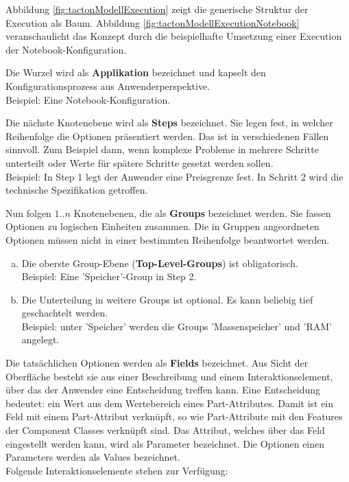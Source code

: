 \documentclass[12pt,a4paper,bibliography=totocnumbered,listof=totoc]{scrartcl}
\begin{document}
Abbildung \ref{fig:tactonModellExecution} zeigt die generische Struktur der Execution als Baum. Abbildung \ref{fig:tactonModellExecutionNotebook} veranschaulicht das Konzept durch die beispielhafte Umsetzung einer Execution der Notebook-Konfiguration.
\begin{compactitem}
\item Die Wurzel wird als \textbf{Applikation} bezeichnet und kapselt den Konfigurationsprozess aus Anwenderperspektive.\\
Beispiel: Eine Notebook-Konfiguration.
\item Die nächste Knotenebene wird als \textbf{Steps} bezeichnet. Sie legen fest, in welcher Reihenfolge die Optionen präsentiert werden. Das ist in verschiedenen Fällen sinnvoll. Zum Beispiel dann, wenn komplexe Probleme in mehrere Schritte unterteilt oder Werte für spätere Schritte gesetzt werden sollen.\\
Beispiel: In Step 1 legt der Anwender eine Preisgrenze fest. In Schritt 2 wird die technische Spezifikation getroffen.
\item  Nun folgen $1..n$ Knotenebenen, die als \textbf{Groups} bezeichnet werden. Sie fassen Optionen zu logischen Einheiten zusammen. Die in Gruppen angeordneten Optionen müssen nicht in einer bestimmten Reihenfolge beantwortet werden.
\begin{enumerate}[(a)]
\item Die oberste Group-Ebene (\textbf{Top-Level-Groups}) ist obligatorisch.\\
Beispiel: Eine 'Speicher'-Group in Step 2.
\item Die Unterteilung in weitere Groups ist optional. Es kann beliebig tief geschachtelt werden.\\
Beispiel: unter 'Speicher' werden die Groups 'Massenspeicher' und 'RAM' angelegt.
\end{enumerate}
\item Die tatsächlichen Optionen werden als \textbf{Fields} bezeichnet. Aus Sicht der Oberfläche besteht sie aus einer Beschreibung und einem Interaktionselement, über das der Anwender eine Entscheidung treffen kann. Eine Entscheidung bedeutet: ein Wert aus dem Wertebereich eines Part-Attributes. Damit ist ein Feld mit einem Part-Attribut verknüpft, so wie Part-Attribute mit den Features der Component Classes verknüpft sind. Das Attribut, welches über das Feld eingestellt werden kann, wird als Parameter bezeichnet. Die Optionen einen Parameters werden als Values bezeichnet.\\
Folgende Interaktionselemente stehen zur Verfügung:

\end{compactitem}
\end{document}

